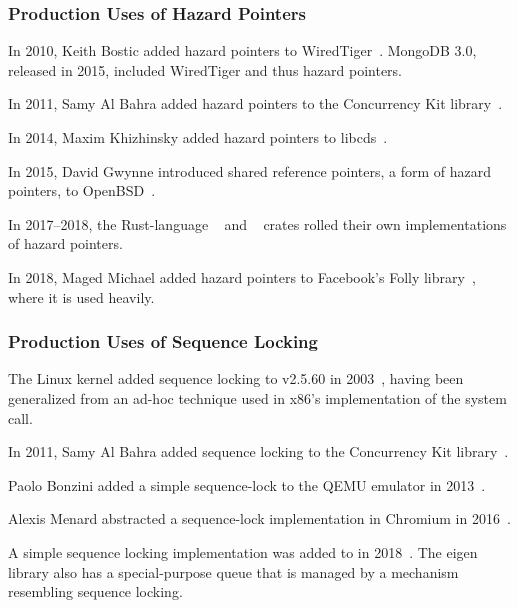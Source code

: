 \fi

\subsubsection{Production Uses of Hazard Pointers}
\label{sec:defer:Production Uses of Hazard Pointers}

In 2010, Keith Bostic added hazard pointers to
WiredTiger~\cite{KeithBostic2010WiredTigerhazptr}.
MongoDB 3.0, released in 2015, included WiredTiger and thus hazard pointers.

In 2011, Samy Al Bahra added hazard pointers to the Concurrency Kit
library~\cite{SamyAlBahra2011ckhp}.

In 2014, Maxim Khizhinsky added hazard pointers to
libcds~\cite{MaximKhizhinsky2014libcdsHazptr}.

In 2015, David Gwynne introduced shared reference pointers, a form
of hazard pointers, to OpenBSD~\cite{DavidGwynne2015srp}.

In 2017--2018, the Rust-language
~\cite{MichalVaner2018arc-swapHazptr} and
~\cite{crates.io.user.ticki2017concHazptr}
crates rolled their own implementations of hazard pointers.

In 2018, Maged Michael added hazard pointers to Facebook's Folly
library~\cite{MagedMichael2018FollyHazptr}, where it is used heavily.

\subsubsection{Production Uses of Sequence Locking}
\label{sec:defer:Production Uses of Sequence Locking}

The Linux kernel added sequence locking to v2.5.60 in
2003~\cite{JonathanCorbet2003seqlock}, having been generalized from
an ad-hoc technique used in x86's implementation of the
 system call.

In 2011, Samy Al Bahra added sequence locking to the Concurrency Kit
library~\cite{SamyAlBahra2011ckseqlock}.

Paolo Bonzini added a simple sequence-lock to the QEMU emulator in
2013~\cite{PaoloBonzini2013QEMUseqlock}.

Alexis Menard abstracted a sequence-lock implementation in Chromium
in 2016~\cite{AlexisMenard2016ChromiumSeqLock}.

A simple sequence locking implementation was added to 
in 2018~\cite{DavidGoldblatt2018seqlock}.
The eigen library also has a special-purpose queue that is managed by
a mechanism resembling sequence locking.

